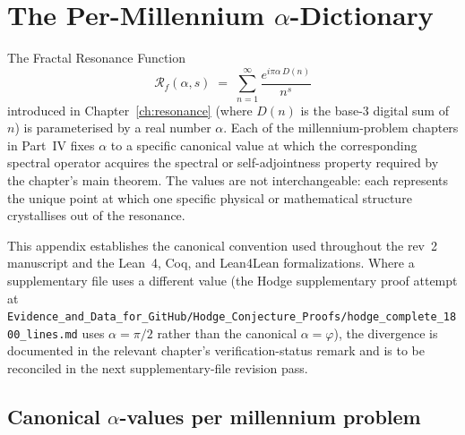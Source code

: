 \chapter*{The Per-Millennium $\alpha$-Dictionary}
\label{ch:alpha-dictionary}

The Fractal Resonance Function
\begin{equation}\label{eq:alpha-dict-Rf-def}
\mathcal{R}_f(\alpha, s) \;=\; \sum_{n=1}^{\infty} \frac{e^{i\pi\alpha\, D(n)}}{n^{s}}
\end{equation}
introduced in Chapter~\ref{ch:resonance} (where $D(n)$ is the base-$3$ digital sum of $n$) is parameterised by a real number $\alpha$. Each of the millennium-problem chapters in Part~IV fixes $\alpha$ to a specific canonical value at which the corresponding spectral operator acquires the spectral or self-adjointness property required by the chapter's main theorem. The values are not interchangeable: each represents the unique point at which one specific physical or mathematical structure crystallises out of the resonance.

This appendix establishes the canonical convention used throughout the rev~2 manuscript and the Lean~4, Coq, and Lean4Lean formalizations. Where a supplementary file uses a different value (the Hodge supplementary proof attempt at \texttt{Evidence\_and\_Data\_for\_GitHub/Hodge\_Conjecture\_Proofs/hodge\_complete\_1800\_lines.md} uses $\alpha = \pi/2$ rather than the canonical $\alpha = \varphi$), the divergence is documented in the relevant chapter's verification-status remark and is to be reconciled in the next supplementary-file revision pass.

\section*{Canonical $\alpha$-values per millennium problem}

